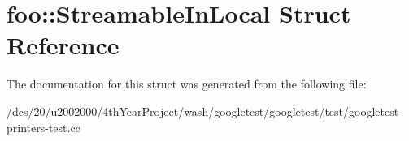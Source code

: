 \hypertarget{structfoo_1_1StreamableInLocal}{}\section{foo\+:\+:Streamable\+In\+Local Struct Reference}
\label{structfoo_1_1StreamableInLocal}


The documentation for this struct was generated from the following file\+:\begin{DoxyCompactItemize}
\item 
/dcs/20/u2002000/4th\+Year\+Project/wash/googletest/googletest/test/googletest-\/printers-\/test.\+cc\end{DoxyCompactItemize}
